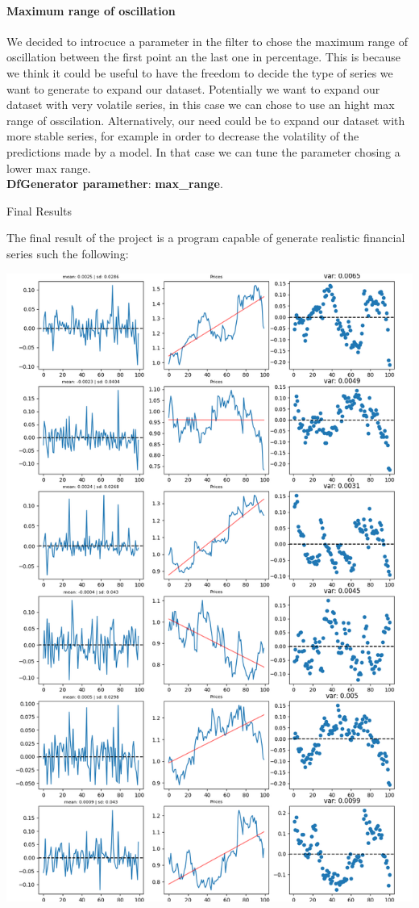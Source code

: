 \documentclass{article}
\begin{document}
\begin{multicols}{2}
    \paragraph*{Maximum range of oscillation}
    We decided to introcuce a parameter in the filter to chose the maximum range of oscillation between the first point an the last one in percentage. This is because we think it could be useful to have the freedom to decide the type of series we want 
    to generate to expand our dataset. Potentially we want to expand our dataset with very volatile series, in this case we can chose to use an hight max range of osscilation. Alternatively, our need could be to expand our dataset with more stable series, for example in order to decrease 
    the volatility of the predictions made by a model. In that case we can tune the parameter chosing a lower max range.\\
    \textbf{DfGenerator paramether}:  \textbf{max\_range}.

    \end{multicols}
    \newpage
    \begin{center}
        {\huge{Final Results}}
    \end{center} 
    The final result of the project is a program capable of generate realistic financial series such the following:
    \begin{center}
        \includegraphics[scale=0.5]{imgs/riccardo/results_reduced.png}
    \end{center}
\end{document}
